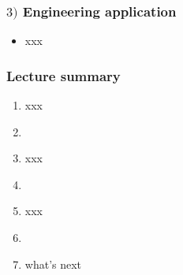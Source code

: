 \documentclass[english,14pt]{beamer}
\begin{document}

\begin{frame}[fragile]

\frametitle{$3)$ Engineering application}

\begin{itemize}
	\item xxx
\end{itemize}

\end{frame}



\begin{frame}[fragile]

\frametitle{Lecture summary}

\begin{enumerate}
	\item xxx
	
	\item[]
	
	\item xxx
	
	\item[]
	
	\item xxx
	
	\item[]
	
	\item what's next
	
\end{enumerate}

\end{frame}
\end{document}

